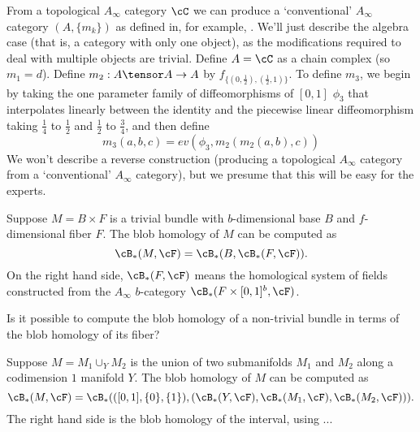 From a topological $A_\infty$ category $\cC$ we can produce a `conventional' $A_\infty$ category $(A, \{m_k\})$ as defined in, for example, \cite{Keller}. We'll just describe the algebra case (that is, a category with only one object), as the modifications required to deal with multiple objects are trivial. Define $A = \cC$ as a chain complex (so $m_1 = d$). Define $m_2 : A\tensor A \to A$ by $f_{\{(0,\frac{1}{2}),(\frac{1}{2},1)\}}$. To define $m_3$, we begin by taking the one parameter family of diffeomorphisms of $[0,1]$ $\phi_3$ that interpolates linearly between the identity and the piecewise linear diffeomorphism taking $\frac{1}{4}$ to $\frac{1}{2}$ and $\frac{1}{2}$ to $\frac{3}{4}$, and then define
\begin{equation*}
m_3(a,b,c) = ev(\phi_3, m_2(m_2(a,b), c))
\end{equation*}
We won't describe a reverse construction (producing a topological $A_\infty$ category from a `conventional' $A_\infty$ category), but we presume that this will be easy for the experts.

\begin{thm}
Suppose $M = B \times F$ is a trivial bundle with $b$-dimensional base $B$ and $f$-dimensional fiber $F$. The blob homology of $M$ can be computed as
\begin{equation*}
\cB_*(M, \cF) = \cB_*(B, \cB_*(F, \cF)).
\end{equation*}
On the right hand side, $\cB_*(F, \cF)$ means the homological system of fields constructed from the $A_\infty$ $b$-category $\cB_*(F \times [0,1]^b, \cF)$.
\end{thm}

\begin{question}
Is it possible to compute the blob homology of a non-trivial bundle in terms of the blob homology of its fiber?
\end{question}

\begin{thm}
Suppose $M = M_1 \cup_Y M_2$ is the union of two submanifolds $M_1$ and $M_2$ along a codimension $1$ manifold $Y$. The blob homology of $M$ can be computed as
\begin{equation*}
\cB_*(M, \cF) = \cB_*(([0,1], \{0\}, \{1\}), (\cB_*(Y, \cF), \cB_*(M_1, \cF), \cB_*(M_2, \cF))).
\end{equation*}
The right hand side is the blob homology of the interval, using ...
\end{thm}